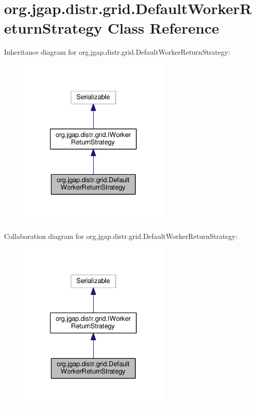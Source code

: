 \hypertarget{classorg_1_1jgap_1_1distr_1_1grid_1_1_default_worker_return_strategy}{\section{org.\-jgap.\-distr.\-grid.\-Default\-Worker\-Return\-Strategy Class Reference}
\label{classorg_1_1jgap_1_1distr_1_1grid_1_1_default_worker_return_strategy}
}


Inheritance diagram for org.\-jgap.\-distr.\-grid.\-Default\-Worker\-Return\-Strategy\-:
\nopagebreak
\begin{figure}[H]
\begin{center}
\leavevmode
\includegraphics[width=208pt]{classorg_1_1jgap_1_1distr_1_1grid_1_1_default_worker_return_strategy__inherit__graph}
\end{center}
\end{figure}


Collaboration diagram for org.\-jgap.\-distr.\-grid.\-Default\-Worker\-Return\-Strategy\-:
\nopagebreak
\begin{figure}[H]
\begin{center}
\leavevmode
\includegraphics[width=208pt]{classorg_1_1jgap_1_1distr_1_1grid_1_1_default_worker_return_strategy__coll__graph}
\end{center}
\end{figure}
